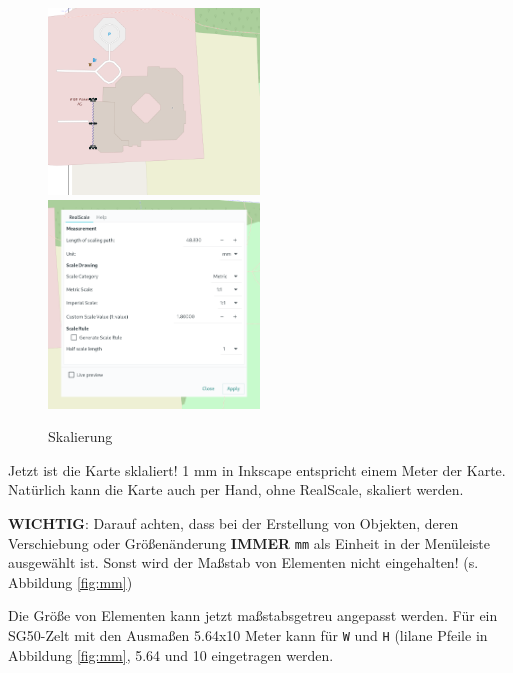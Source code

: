 \documentclass[letterpaper,12pt,
				parkskip = half]{article}
\begin{document}
\begin{figure}[!h]
		\includegraphics[width=0.5\textwidth]{Images/rwe.png}	
		\includegraphics[width=0.5\textwidth]{Images/realscale.png}	
	\caption{Skalierung}
	\label{fig:scaling_ausfuellen}
\end{figure}

Jetzt ist die Karte sklaliert! 1 mm in Inkscape entspricht einem Meter der Karte. Natürlich kann die Karte auch per Hand, ohne RealScale, skaliert werden.



\textbf{WICHTIG}: Darauf achten, dass bei der Erstellung von Objekten, deren Verschiebung oder Größenänderung \textbf{IMMER} \texttt{mm} als Einheit in der Menüleiste ausgewählt ist. Sonst wird der Maßstab von Elementen nicht eingehalten! (s. Abbildung \ref{fig:mm})

Die Größe von Elementen kann jetzt maßstabsgetreu angepasst werden. Für ein SG50-Zelt mit den Ausmaßen 5.64x10 Meter kann für \texttt{W} und \texttt{H} (lilane Pfeile in Abbildung \ref{fig:mm}, 5.64 und 10 eingetragen werden. 
\end{document}
